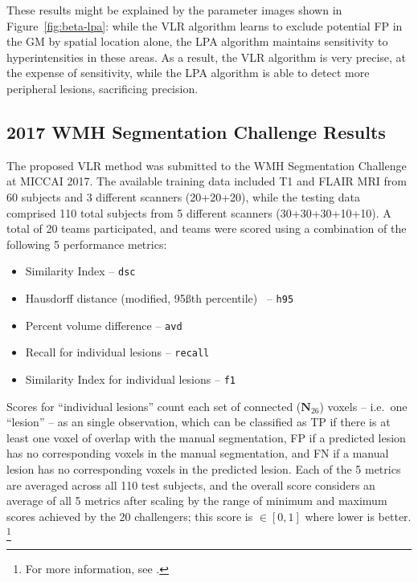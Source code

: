 These results might be explained by the parameter images shown in Figure~\ref{fig:beta-lpa}:
while the VLR algorithm learns to exclude potential FP in the GM by spatial location alone,
the LPA algorithm maintains sensitivity to hyperintensities in these areas.
As a result, the VLR algorithm is very precise, at the expense of sensitivity,
while the LPA algorithm is able to detect more peripheral lesions, sacrificing precision.
\subsection{2017 WMH Segmentation Challenge Results}\label{ss:exp-wmhseg17}
The proposed VLR method was submitted to the WMH Segmentation Challenge at MICCAI 2017.
The available training data included T1 and FLAIR MRI
from 60 subjects and 3 different scanners (20+20+20),
while the testing data comprised
110 total subjects from 5 different scanners (30+30+30+10+10).
A total of 20 teams participated,
and teams were scored using a combination of the following 5 performance metrics:
\begin{itemize}[itemsep=0pt,topsep=0pt]
  \item Similarity Index -- \texttt{dsc}
  \item Hausdorff distance (modified, 95\ss{th} percentile)~\cite{Dubuisson1994} -- \texttt{h95}
  \item Percent volume difference -- \texttt{avd}
  \item Recall for individual lesions -- \texttt{recall}
  \item Similarity Index for individual lesions -- \texttt{f1}
\end{itemize}
Scores for ``individual lesions''
count each set of connected ($\mathbf{N}_{26}$) voxels
-- i.e.\ one ``lesion'' -- as an single observation,
which can be classified as
TP if there is at least one voxel of overlap with the manual segmentation,
FP if a predicted lesion has no corresponding voxels in the manual segmentation, and
FN if a manual lesion has no corresponding voxels in the predicted lesion.
Each of the 5 metrics are averaged across all 110 test subjects,
and the overall score considers an average of all 5 metrics
after scaling by the range of minimum and maximum scores achieved by the 20 challengers;
this score is $\in [0,1]$ where lower is better.%
\footnote{For more information, see .}
\par
